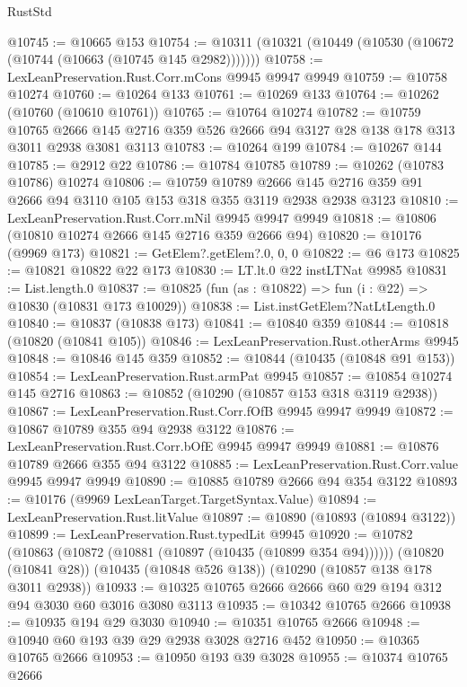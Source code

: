 \begin{lexlean}{RustStd}
\begin{coremodule}
@10745 := @10665 @153
@10754 := @10311 (@10321 (@10449 (@10530 (@10672 (@10744 (@10663 (@10745 @145 @2982)))))))
@10758 := LexLeanPreservation.Rust.Corr.mCons @9945 @9947 @9949
@10759 := @10758 @10274
@10760 := @10264 @133
@10761 := @10269 @133
@10764 := @10262 (@10760 (@10610 @10761))
@10765 := @10764 @10274
@10782 := @10759
    @10765
    @2666
    @145
    @2716
    @359
    @526
    @2666
    @94
    @3127
    @28
    @138
    @178
    @313
    @3011
    @2938
    @3081
    @3113
@10783 := @10264 @199
@10784 := @10267 @144
@10785 := @2912 @22
@10786 := @10784 @10785
@10789 := @10262 (@10783 @10786) @10274
@10806 := @10759
    @10789
    @2666
    @145
    @2716
    @359
    @91
    @2666
    @94
    @3110
    @105
    @153
    @318
    @355
    @3119
    @2938
    @2938
    @3123
@10810 := LexLeanPreservation.Rust.Corr.mNil @9945 @9947 @9949
@10818 := @10806 (@10810 @10274 @2666 @145 @2716 @359 @2666 @94)
@10820 := @10176 (@9969 @173)
@10821 := GetElem?.getElem?.{0, 0, 0}
@10822 := @6 @173
@10825 := @10821 @10822 @22 @173
@10830 := LT.lt.{0} @22 instLTNat @9985
@10831 := List.length.{0}
@10837 := @10825 (fun (as : @10822) => fun (i : @22) => @10830 (@10831 @173 @10029))
@10838 := List.instGetElem?NatLtLength.{0}
@10840 := @10837 (@10838 @173)
@10841 := @10840 @359
@10844 := @10818 (@10820 (@10841 @105))
@10846 := LexLeanPreservation.Rust.otherArms @9945
@10848 := @10846 @145 @359
@10852 := @10844 (@10435 (@10848 @91 @153))
@10854 := LexLeanPreservation.Rust.armPat @9945
@10857 := @10854 @10274 @145 @2716
@10863 := @10852 (@10290 (@10857 @153 @318 @3119 @2938))
@10867 := LexLeanPreservation.Rust.Corr.fOfB @9945 @9947 @9949
@10872 := @10867 @10789 @355 @94 @2938 @3122
@10876 := LexLeanPreservation.Rust.Corr.bOfE @9945 @9947 @9949
@10881 := @10876 @10789 @2666 @355 @94 @3122
@10885 := LexLeanPreservation.Rust.Corr.value @9945 @9947 @9949
@10890 := @10885 @10789 @2666 @94 @354 @3122
@10893 := @10176 (@9969 LexLeanTarget.TargetSyntax.Value)
@10894 := LexLeanPreservation.Rust.litValue
@10897 := @10890 (@10893 (@10894 @3122))
@10899 := LexLeanPreservation.Rust.typedLit @9945
@10920 := @10782
    (@10863 (@10872 (@10881 (@10897 (@10435 (@10899 @354 @94))))))
    (@10820 (@10841 @28))
    (@10435 (@10848 @526 @138))
    (@10290 (@10857 @138 @178 @3011 @2938))
@10933 := @10325 @10765 @2666 @2666 @60 @29 @194 @312 @94 @3030 @60 @3016 @3080 @3113
@10935 := @10342 @10765 @2666
@10938 := @10935 @194 @29 @3030
@10940 := @10351 @10765 @2666
@10948 := @10940 @60 @193 @39 @29 @2938 @3028 @2716 @452
@10950 := @10365 @10765 @2666
@10953 := @10950 @193 @39 @3028
@10955 := @10374 @10765 @2666

\end{coremodule}
\end{lexlean}
